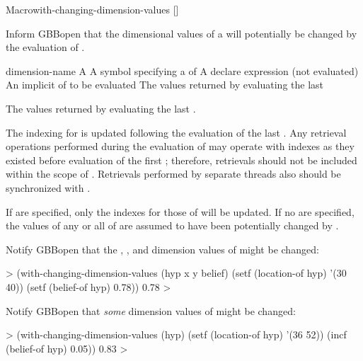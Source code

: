 \documentclass[10pt,twoside,english,pdftex]{article}
\begin{document}
\begin{functiondoc}{Macro}{with-changing-dimension-values}%
  {\code{(} 
         [\superstar{}]\code{)}
    \superstar{}
    \superstar{}
    \returns{} \superstar}
%
  
\fnsyntax

\fnpurpose Inform GBBopen that the dimensional values of a
 will potentially be changed by the evaluation of
.

\fnpackage {}

\fnmodule {}

\fnargs
\begin{args}{dimension-name}
 A 
 A symbol specifying a  of
\arg[declaration] A declare expression (not evaluated)
\arg[forms] An implicit  of  to be evaluated
\arg[results] The values returned by evaluating the last 
\end{args}

\fnreturns The values returned by evaluating the last .

\fndescription The indexing for  is updated following the
evaluation of the last .  Any retrieval operations performed during
the evaluation of  may operate with indexes as they existed
before evaluation of the first ; therefore, retrievals should not be
included within the scope of .
Retrievals performed by separate threads also should be synchronized with
.

If  are specified, only the indexes for those
 of  will be updated. If no
 are specified, the values of any or all
 of  are assumed to have been
potentially changed by .

\fnexamples Notify GBBopen that the , , and
 dimension values of  might be changed:
%
\W\supp
\begin{example}
  > (with-changing-dimension-values (hyp x y belief)
      (setf (location-of hyp) '(30 40))
      (setf (belief-of hyp) 0.78))
  0.78
  >
\end{example}
%
Notify GBBopen that \textit{some\/} dimension values of  might be
changed:
%
\W\supp\notpretop
\begin{example}
  > (with-changing-dimension-values (hyp)
      (setf (location-of hyp) '(36 52))
      (incf (belief-of hyp) 0.05))
  0.83
  >
\end{example}

\end{functiondoc}
\end{document}
